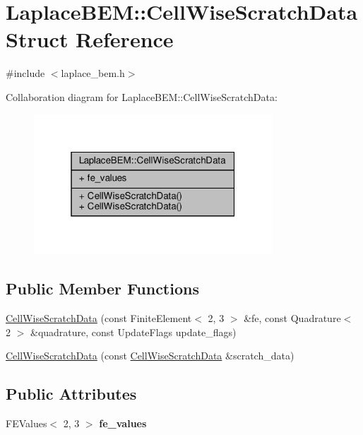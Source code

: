 \hypertarget{structLaplaceBEM_1_1CellWiseScratchData}{}\section{Laplace\+B\+EM\+:\+:Cell\+Wise\+Scratch\+Data Struct Reference}
\label{structLaplaceBEM_1_1CellWiseScratchData}


{\ttfamily \#include $<$laplace\+\_\+bem.\+h$>$}



Collaboration diagram for Laplace\+B\+EM\+:\+:Cell\+Wise\+Scratch\+Data\+:\nopagebreak
\begin{figure}[H]
\begin{center}
\leavevmode
\includegraphics[width=253pt]{structLaplaceBEM_1_1CellWiseScratchData__coll__graph}
\end{center}
\end{figure}
\subsection*{Public Member Functions}
\begin{DoxyCompactItemize}
\item 
\hyperlink{structLaplaceBEM_1_1CellWiseScratchData_a8c68ff088ad75f1e448ef566aca92c68}{Cell\+Wise\+Scratch\+Data} (const Finite\+Element$<$ 2, 3 $>$ \&fe, const Quadrature$<$ 2 $>$ \&quadrature, const Update\+Flags update\+\_\+flags)
\item 
\hyperlink{structLaplaceBEM_1_1CellWiseScratchData_a79b511c5ed570ee3ec98c5891299fd7f}{Cell\+Wise\+Scratch\+Data} (const \hyperlink{structLaplaceBEM_1_1CellWiseScratchData}{Cell\+Wise\+Scratch\+Data} \&scratch\+\_\+data)
\end{DoxyCompactItemize}
\subsection*{Public Attributes}
\begin{DoxyCompactItemize}
\item 
\mbox{\label{structLaplaceBEM_1_1CellWiseScratchData_a0ce455399dde0e15e30cbe62bf8ebb13}} 
F\+E\+Values$<$ 2, 3 $>$ {\bfseries fe\+\_\+values}
\end{DoxyCompactItemize}


